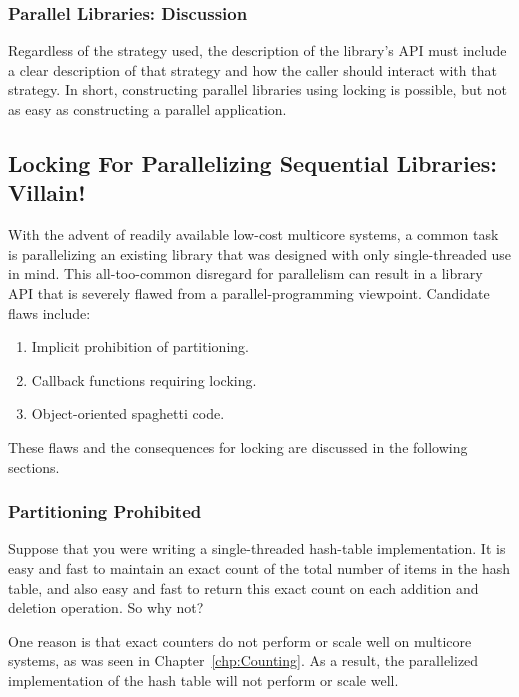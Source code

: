\fi

\subsubsection{Parallel Libraries: Discussion}
\label{sec:locking:Parallel Libraries: Discussion}

Regardless of the strategy used, the description of the library's API
must include a clear description of that strategy and how the caller
should interact with that strategy.
In short, constructing parallel libraries using locking is possible,
but not as easy as constructing a parallel application.

\subsection{Locking For Parallelizing Sequential Libraries: Villain!}
\label{sec:locking:Locking For Parallelizing Sequential Libraries: Villain!}

With the advent of readily available low-cost multicore systems,
a common task is parallelizing an existing library that was designed
with only single-threaded use in mind.
This all-too-common disregard for parallelism can result in a library
API that is severely flawed from a parallel-programming viewpoint.
Candidate flaws include:

\begin{enumerate}
\item	Implicit prohibition of partitioning.
\item	Callback functions requiring locking.
\item	Object-oriented spaghetti code.
\end{enumerate}

These flaws and the consequences for locking are discussed in the following
sections.

\subsubsection{Partitioning Prohibited}
\label{sec:locking:Partitioning Prohibited}

Suppose that you were writing a single-threaded hash-table implementation.
It is easy and fast to maintain an exact count of the total number of items
in the hash table, and also easy and fast to return this exact count on each
addition and deletion operation.
So why not?

One reason is that exact counters do not perform or scale well on
multicore systems, as was
seen in Chapter~\ref{chp:Counting}.
As a result, the parallelized implementation of the hash table will not
perform or scale well.

